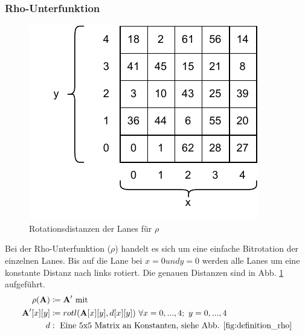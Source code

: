 \subsubsection{Rho-Unterfunktion}
\begin{figure}
    \center
    \includegraphics{images/rho.pdf}
    \caption{Rotationsdistanzen der Lanes für $\rho$}
    \label{fig:definition_rho}
\end{figure}
Bei der Rho-Unterfunktion ($\rho$) handelt es sich um eine einfache Bitrotation der einzelnen Lanes.
Bis auf die Lane bei $x=0 und y=0$ werden alle Lanes um eine konstante Distanz nach links rotiert.
Die genauen Distanzen sind in Abb. \ref{fig:definition_rho} aufgeführt.
\begin{align*}
    \rho (\textbf{A}) & \coloneq \textbf{A}^\prime \text{ mit } \\
    \textbf{A}^\prime[x][y] & \coloneq rotl(\textbf{A}[x][y], d[x][y])\ \forall x = 0,...,4;\ y = 0,...,4 \\
    d & :\text{ Eine 5x5 Matrix an Konstanten, siehe Abb. \ref{fig:definition_rho}}
\end{align*}

